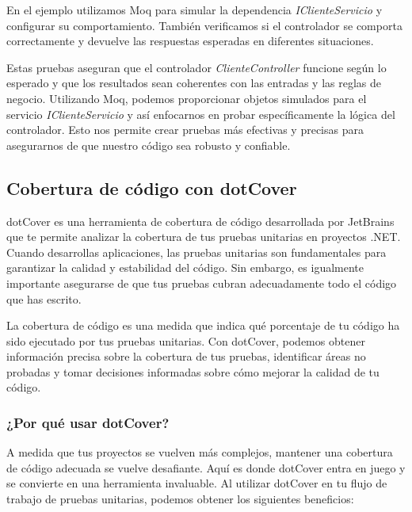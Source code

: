 \documentclass[executivepaper]{article}
\begin{document}
En el ejemplo utilizamos Moq para simular la dependencia \emph{IClienteServicio} y configurar su comportamiento. También verificamos si el controlador se comporta correctamente y devuelve las respuestas esperadas en diferentes situaciones.

Estas pruebas aseguran que el controlador \emph{ClienteController} funcione según lo esperado y que los resultados sean coherentes con las entradas y las reglas de negocio. Utilizando Moq, podemos proporcionar objetos simulados para el servicio \emph{IClienteServicio} y así enfocarnos en probar específicamente la lógica del controlador. Esto nos permite crear pruebas más efectivas y precisas para asegurarnos de que nuestro código sea robusto y confiable.

\subsection{Cobertura de código con dotCover}

dotCover es una herramienta de cobertura de código desarrollada por JetBrains que te permite analizar la cobertura de tus pruebas unitarias en proyectos .NET. Cuando desarrollas aplicaciones, las pruebas unitarias son fundamentales para garantizar la calidad y estabilidad del código. Sin embargo, es igualmente importante asegurarse de que tus pruebas cubran adecuadamente todo el código que has escrito.

La cobertura de código es una medida que indica qué porcentaje de tu código ha sido ejecutado por tus pruebas unitarias. Con dotCover, podemos obtener información precisa sobre la cobertura de tus pruebas, identificar áreas no probadas y tomar decisiones informadas sobre cómo mejorar la calidad de tu código.

\subsubsection*{¿Por qué usar dotCover?}

A medida que tus proyectos se vuelven más complejos, mantener una cobertura de código adecuada se vuelve desafiante. Aquí es donde dotCover entra en juego y se convierte en una herramienta invaluable. Al utilizar dotCover en tu flujo de trabajo de pruebas unitarias, podemos obtener los siguientes beneficios:
\end{document}
